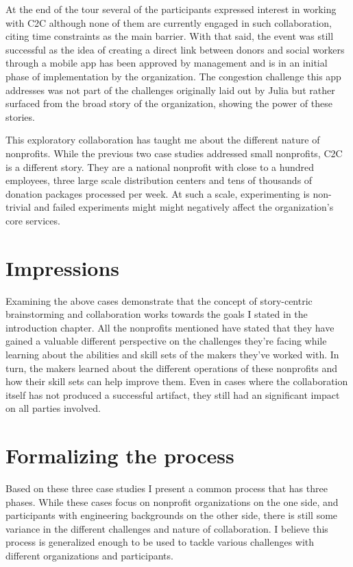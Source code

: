 At the end of the tour several of the participants expressed interest in working with C2C although none of them are currently engaged in such collaboration, citing time constraints as the main barrier. With that said, the event was still successful as the idea of creating a direct link between donors and social workers through a mobile app has been approved by management and is in an initial phase of implementation by the organization. The congestion challenge this app addresses was not part of the challenges originally laid out by Julia but rather surfaced from the broad story of the organization, showing the power of these stories.  

This exploratory collaboration has taught me about the different nature of nonprofits. While the previous two case studies addressed small nonprofits, C2C is a different story. They are a national nonprofit with close to a hundred employees, three large scale distribution centers and tens of thousands of donation packages processed per week. At such a scale, experimenting is non-trivial and failed experiments might might negatively affect the organization’s core services. 

\section{Impressions}

Examining the above cases demonstrate that the concept of story-centric brainstorming and collaboration works towards the goals I stated in the introduction chapter. All the nonprofits mentioned have stated that they have gained a valuable different perspective on the challenges they're facing while learning about the abilities and skill sets of the makers they've worked with. In turn, the makers learned about the different operations of these nonprofits and how their skill sets can help improve them. Even in cases where the collaboration itself has not produced a successful artifact, they still had an significant impact on all parties involved. 

\section{Formalizing the process}

Based on these three case studies I present a common process that has three phases. While these cases focus on nonprofit organizations on the one side, and participants with engineering backgrounds on the other side, there is still some variance in the different challenges and nature of collaboration. I believe this process is generalized enough to be used to tackle various challenges with different organizations and participants. 

